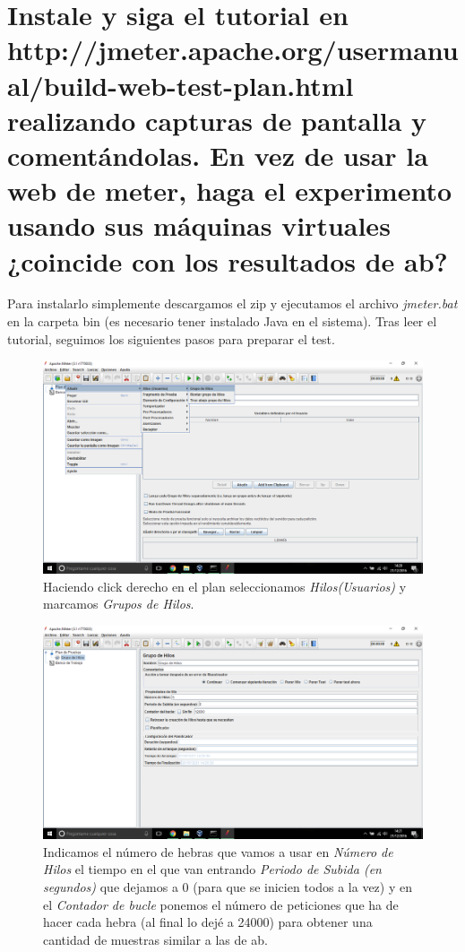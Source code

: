 \section{Instale y siga el tutorial en http://jmeter.apache.org/usermanual/build-web-test-plan.html realizando capturas de pantalla y comentándolas. En vez de usar la web de meter, haga el experimento usando sus máquinas virtuales ¿coincide con los resultados de ab?}
Para instalarlo simplemente descargamos el zip y ejecutamos el archivo \textit{jmeter.bat} en la carpeta bin (es necesario tener instalado Java en el sistema).
Tras leer el tutorial, seguimos los siguientes pasos para preparar el test.

\begin{figure}[H]
	\centering
	\includegraphics[scale=0.3]{jmeter1.png}
	\caption{Haciendo click derecho en el plan seleccionamos \textit{Hilos(Usuarios)} y marcamos \textit{Grupos de Hilos}.}
\end{figure}
\begin{figure}[H]
	\centering
	\includegraphics[scale=0.3]{jmeter2.png}
	\caption[Grupo de Hilos en Apache JMeter.]{Indicamos el número de hebras que vamos a usar en \textit{Número de Hilos} el tiempo en el que van entrando \textit{Periodo de Subida (en segundos)} que dejamos a 0 (para que se inicien todos a la vez) y en el \textit{Contador de bucle} ponemos el número de peticiones que ha de hacer cada hebra (al final lo dejé a 24000) para obtener una cantidad de muestras similar a las de ab.}
\end{figure}
